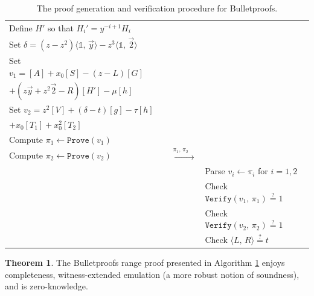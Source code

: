 \documentclass[11pt,letterpaper]{article}
\theoremstyle{definition}
\newtheorem{theorem}{Theorem}[subsection]
\newcommand{\6}{\mathbf}
\newcommand{\7}{\mathcal}
\newcommand{\ip}[2]{{\langle {#1}, \, {#2} \rangle}}
\newcommand{\one}{\mathbb{1}}
\begin{document}
\begin{table}[H]
\begin{tabular}{|lcl|}
    Define $H'$ so that $H_i' = y^{-i+1} H_i$ &&\\
    Set $\delta = (z - z^2) \ip{\one}{\vec{y}} - z^3 \ip{\one}{\vec{2}}$ &&\\

    Set $v_1 = [A] + x_0 [S] - (z - L) [G] $ &&\\
    \quad \quad $+ (z \vec{y} + z^2 \vec{2} - R) [H'] - \mu [h]$ &&\\

    Set $v_2 = z^2 [V] + (\delta - t) [g]  - \tau [h]$ &&\\
    \quad \quad $+ x_0 [T_1] + x_0^2 [T_2]$ &&\\




    Compute $\pi_1 \leftarrow \texttt{Prove}(v_1)$ &&\\
    Compute $\pi_2 \leftarrow \texttt{Prove}(v_2)$ & $\xrightarrow{\quad \pi_1, \, \pi_2 \quad}$ &\\

    && Parse $v_i \leftarrow \pi_i$ for $i = 1, 2$ \\
    && Check $\texttt{Verify}(v_1, \, \pi_1) \stackrel{?}{=} 1$ \\
    && Check $\texttt{Verify}(v_2, \, \pi_2) \stackrel{?}{=} 1$ \\
    && Check $\ip{L}{R} \stackrel{?}{=} t$ \\
    \hline
    \end{tabular}
    \smallskip
    \caption{The proof generation and verification procedure for Bulletproofs.}
    \label{alg:BPMain}
\end{table}





\begin{theorem}
    The Bulletproofs range proof presented in Algorithm \ref{alg:BPMain} enjoys completeness, witness-extended emulation (a more robust notion of soundness), and is zero-knowledge.
\end{theorem}
\end{document}
